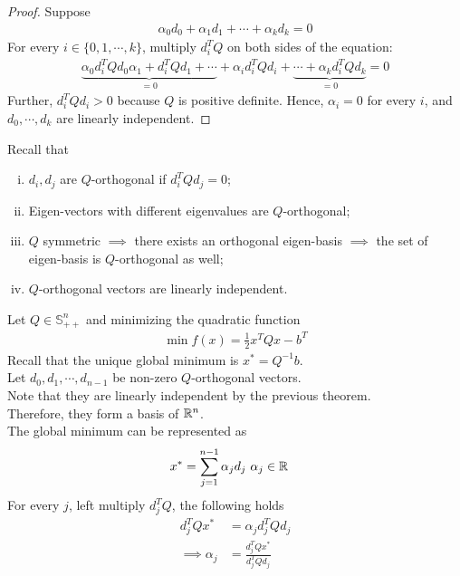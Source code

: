\documentclass{article}
\begin{document}
	\begin{proof}
		Suppose
		\begin{align}
			\alpha_0 d_0 + \alpha_1 d_1 + \cdots + \alpha_k d_k = 0
		\end{align}
		 For every $i \in \{0, 1, \cdots, k\}$, multiply $d_i^T Q$ on both sides of the equation:
		 \begin{align}
		 	\underbrace{\alpha_0 d_i^T Q d_0
		 	\alpha_1 + d_i^T Q d_1 
		 	+ \cdots}_{=0}
		 	+ \alpha_i d_i^T Q d_i
		 	+ \underbrace{\cdots 
		 	+\alpha_k d_i^T Q d_k}_{=0} = 0
		 \end{align}
		 Further, $d_i^T Q d_i > 0$ because $Q$ is positive definite. Hence, $\alpha_i = 0$ for every $i$, and $d_0, \cdots, d_k$ are linearly independent.
	\end{proof}
	
	\begin{lemma}
		Recall that 
		\begin{enumerate}[(i)]
			\item $d_i, d_j$ are $Q$-orthogonal if $d_i^T Q d_j = 0$;
			\item Eigen-vectors with different eigenvalues are $Q$-orthogonal;
			\item $Q$ symmetric $\implies$ there exists an orthogonal eigen-basis $\implies$ the set of eigen-basis is $Q$-orthogonal as well;
			\item $Q$-orthogonal vectors are linearly independent.
		\end{enumerate}
	\end{lemma}
	
	\begin{example}
		Let $Q \in \mathbb{S}_{++}^n$ and minimizing the quadratic function
		\begin{align}
			\min f(x) = \frac{1}{2} x^T Q x - b^T 
		\end{align}
		Recall that the unique global minimum is $x^* = Q^{-1} b$. \\
		Let $d_0, d_1, \cdots, d_{n-1}$ be non-zero $Q$-orthogonal vectors. \\
		Note that they are linearly independent by the previous theorem. \\
		Therefore, they form a basis of $\mathbb{R}^n$. \\
		The global minimum can be represented as 
		\begin{align}
			x^* &= \sum_{j=1}^{n-1} \alpha_j d_j\ \alpha_j \in \mathbb{R}
		\end{align}
		For every $j$, left multiply $d_j^T Q$, the following holds
		\begin{align}
			d_j^T Q x^* &= \alpha_j d_j^T Q d_j \\
			\implies \alpha_j &= \frac{d_j^T Q x^*}{d_j^T Q d_j}
		\end{align}
	\end{example}
	
\end{document}
